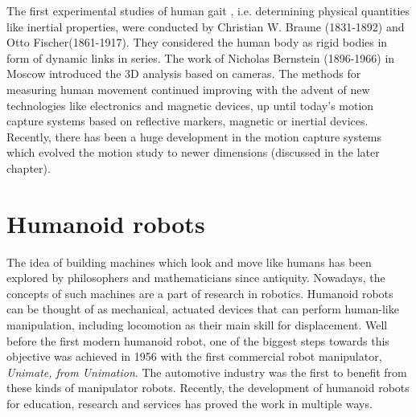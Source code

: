 The first experimental studies of human gait \cite{alma991010593879705596}, i.e. determining physical quantities 
like inertial properties, were conducted by Christian W. Braune (1831-1892) and Otto Fischer(1861-1917). They 
considered the human body as rigid bodies in form of dynamic links in series. The work of Nicholas Bernstein (1896-1966)
in Moscow introduced the 3D analysis based on cameras. The methods for measuring human movement continued improving 
with the advent of new technologies like electronics and magnetic devices, up until today’s motion capture systems 
based on reflective markers, magnetic or inertial devices. Recently, there has been a huge development in the motion 
capture systems which evolved the motion study to newer dimensions (discussed in the later chapter).

\section{Humanoid robots}

The idea of building machines which look and move like humans has been explored by philosophers and mathematicians
since antiquity. Nowadays, the concepts of such machines are a part of research in robotics. Humanoid robots can 
be thought of as mechanical, actuated devices that can perform human-like manipulation, including locomotion as 
their main skill for displacement. Well before the first modern humanoid robot, one of the biggest steps towards 
this objective was achieved in 1956 with the first commercial robot manipulator, \textit{Unimate, from Unimation}. 
The automotive industry was the first to benefit from these kinds of manipulator robots. Recently, the development 
of humanoid robots for education, research and services has proved the work in multiple ways. 

